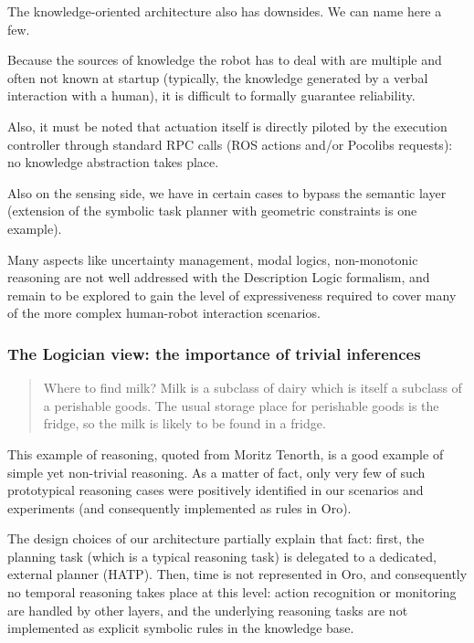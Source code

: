 \documentclass[letterpaper, 10 pt, conference]{ieeeconf}  %
\begin{document}
The knowledge-oriented architecture also has downsides. We can name here a few.

Because the sources of knowledge the robot has to deal with are multiple and
often not known at startup (typically, the knowledge generated by a verbal
interaction with a human), it is difficult to formally guarantee reliability.

Also, it must be noted that actuation itself is directly piloted by the
execution controller through standard RPC calls (ROS actions and/or Pocolibs
requests): no knowledge abstraction takes place.

Also on the sensing side, we have in certain cases to bypass the semantic layer
(extension of the symbolic task planner with geometric constraints is one
example).

Many aspects like uncertainty management, modal logics,
non-monotonic reasoning are not well addressed with the Description Logic
formalism, and remain to be explored to gain the level of expressiveness
required to cover many of the more complex human-robot interaction scenarios.

\subsubsection{The Logician view: the importance of trivial inferences}

\begin{quote}

    Where to find milk? Milk is a subclass of dairy which is itself a subclass
    of a perishable goods. The usual storage place for perishable goods is the
    fridge, so the milk is likely to be found in a fridge.

\end{quote}

This example of reasoning, quoted from Moritz Tenorth, is a good example of
simple yet non-trivial reasoning. As a matter of fact, only very few of such
prototypical reasoning cases were positively identified in our scenarios and experiments
(and consequently implemented as rules in {\sc Oro}).

The design choices of our architecture partially explain that fact: first, the
planning task (which is a typical reasoning task) is delegated to a
dedicated, external planner (HATP). Then, time is not represented in {\sc Oro}, and
consequently no temporal reasoning takes place at this level: action
recognition or monitoring are handled by other layers, and the underlying
reasoning tasks are not implemented as explicit symbolic rules in the knowledge
base.
\end{document}
